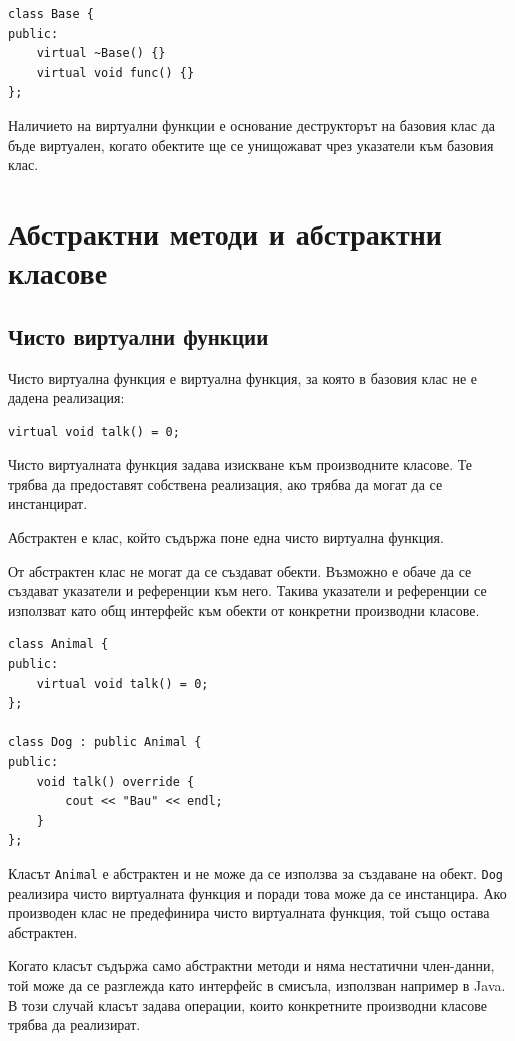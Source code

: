 \begin{verbatim}
class Base {
public:
    virtual ~Base() {}
    virtual void func() {}
};
\end{verbatim}

Наличието на виртуални функции е основание деструкторът на базовия клас да бъде виртуален, когато обектите ще се унищожават чрез указатели към базовия клас.

\section{Абстрактни методи и абстрактни класове}\label{s:17.3}

\subsection{Чисто виртуални функции}\label{s:17.3.1}

Чисто виртуална функция е виртуална функция, за която в базовия клас не е дадена реализация:

\begin{verbatim}
virtual void talk() = 0;
\end{verbatim}

Чисто виртуалната функция задава изискване към производните класове. Те трябва да предоставят собствена реализация, ако трябва да могат да се инстанцират.

\begin{defn}
Абстрактен е клас, който съдържа поне една чисто виртуална функция.
\end{defn}

От абстрактен клас не могат да се създават обекти. Възможно е обаче да се създават указатели и референции към него. Такива указатели и референции се използват като общ интерфейс към обекти от конкретни производни класове.

\begin{verbatim}
class Animal {
public:
    virtual void talk() = 0;
};

class Dog : public Animal {
public:
    void talk() override {
        cout << "Bau" << endl;
    }
};
\end{verbatim}

Класът \texttt{Animal} е абстрактен и не може да се използва за създаване на обект. \texttt{Dog} реализира чисто виртуалната функция и поради това може да се инстанцира. Ако производен клас не предефинира чисто виртуалната функция, той също остава абстрактен.

Когато класът съдържа само абстрактни методи и няма нестатични член-данни, той може да се разглежда като интерфейс в смисъла, използван например в Java. В този случай класът задава операции, които конкретните производни класове трябва да реализират.

